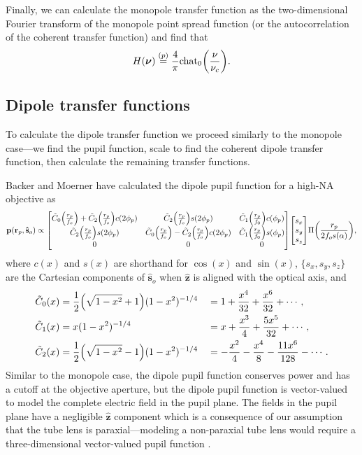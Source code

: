 \documentclass[]{osa-article}
\let\originalleft\left
\let\originalright\right
\renewcommand{\left}{\mathopen{}\mathclose\bgroup\originalleft}
\renewcommand{\right}{\aftergroup\egroup\originalright}
\providecommand{\mb}[1]{\mathbf{#1}}
\providecommand{\so}{\mathbf{\hat{s}}_o}
\providecommand{\rp}{\mathbf{r}_p}
\providecommand{\mh}[1]{\mathbf{\hat{#1}}}
\providecommand{\bs}[1]{\boldsymbol{#1}}
\begin{document}
Finally, we can calculate the monopole transfer function as the two-dimensional Fourier transform of the monopole point spread function (or the autocorrelation
of the coherent transfer function) and find that 
\begin{align}
  H(\bs{\nu}) \stackrel{(p)}{=} \frac{4}{\pi}\text{chat}_0\left(\frac{\nu}{\nu_c}\right).
\end{align}

 \subsection{Dipole transfer functions}
 To calculate the dipole transfer function we proceed similarly to the monopole
 case---we find the pupil function, scale to find the coherent dipole transfer
 function, then calculate the remaining transfer functions.
 
 Backer and Moerner \cite{backer2014} have calculated the dipole pupil function
 for a high-NA objective as
 \begin{align}
   \mb{p}(\rp, \so) \propto
   \begin{bmatrix}
     \tilde{C}_0\left(\frac{r_p}{f_o}\right) + \tilde{C}_2\left(\frac{r_p}{f_o}\right)c(2\phi_p)&\tilde{C}_2\left(\frac{r_p}{f_o}\right)s(2\phi_p)&\tilde{C}_1\left(\frac{r_p}{f_0}\right)c(\phi_p)\\
     \tilde{C}_2\left(\frac{r_p}{f_o}\right)s(2\phi_p)&\tilde{C}_0\left(\frac{r_p}{f_o}\right) - \tilde{C}_2\left(\frac{r_p}{f_o}\right)c(2\phi_p)&\tilde{C}_1\left(\frac{r_p}{f_0}\right)s(\phi_p)\\     
     0&0&0\\     
   \end{bmatrix}
   \begin{bmatrix}
     s_x\\
     s_y\\
     s_z
   \end{bmatrix}
   \Pi\left(\frac{r_p}{2f_os(\alpha)}\right),
 \end{align}
 where $c(x)$ and $s(x)$ are shorthand for $\cos(x)$ and $\sin(x)$,
 $\{s_x, s_y, s_z\}$ are the Cartesian components of $\so$ when $\mh{z}$ is
 aligned with the optical axis, and
 \begin{alignat}{4}
   \tilde{C}_0(x) &= \frac{1}{2}\left(\sqrt{1 - x^2} + 1\right)(1 - x^2)^{-1/4} &&= 1 + \frac{x^4}{32} + \frac{x^6}{32} + \cdots,\\
   \tilde{C}_1(x) &= x(1 - x^2)^{-1/4} &&= x + \frac{x^3}{4} + \frac{5x^5}{32} + \cdots,\\
   \tilde{C}_2(x) &= \frac{1}{2}\left(\sqrt{1 - x^2} - 1\right)(1 - x^2)^{-1/4} &&= -\frac{x^2}{4} - \frac{x^4}{8} - \frac{11x^6}{128} - \cdots.
 \end{alignat}
 Similar to the monopole case, the dipole pupil function conserves power and has
 a cutoff at the objective aperture, but the dipole pupil function is
 vector-valued to model the complete electric field in the pupil plane. The
 fields in the pupil plane have a negligible $\mh{z}$ component which is a
 consequence of our assumption that the tube lens is paraxial---modeling a
 non-paraxial tube lens would require a three-dimensional vector-valued pupil
 function \cite{sheppard1994, gu2000, arnison2002, foreman2011-2}. 
\end{document}
